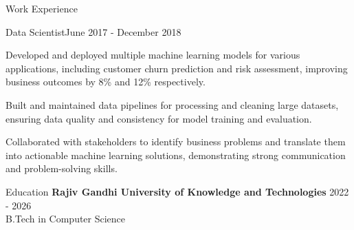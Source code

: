 \documentclass{resume} %
\begin{document}
\begin{rSection}{Work Experience}
\begin{rSubsection}
                {Data Scientist}{June 2017 - December 2018}
                                    {}
                                {}
                                    \item Developed and deployed multiple machine learning models for various applications, including customer churn prediction and risk assessment, improving business outcomes by 8\% and 12\% respectively.
                                    \item Built and maintained data pipelines for processing and cleaning large datasets, ensuring data quality and consistency for model training and evaluation.
                                    \item Collaborated with stakeholders to identify business problems and translate them into actionable machine learning solutions, demonstrating strong communication and problem-solving skills.
                            \end{rSubsection}
            \end{rSection}

\begin{rSection}{Education}
                        \textbf{Rajiv Gandhi University of Knowledge and Technologies} \hfill {2022 - 2026} \\
                            {B.Tech in Computer Science}
                         
             
         
    \end{rSection}
\end{document}
